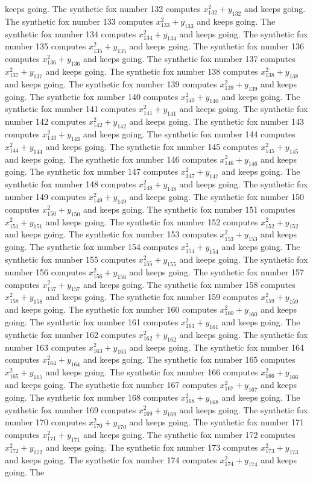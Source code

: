 \documentclass{article}
\begin{document}
keeps going. The synthetic fox number 132 computes $x_{132}^2 + y_{132}$ and keeps going. The synthetic fox number 133 computes $x_{133}^2 + y_{133}$ and keeps going. The synthetic fox number 134 computes $x_{134}^2 + y_{134}$ and keeps going. The synthetic fox number 135 computes $x_{135}^2 + y_{135}$ and keeps going. The synthetic fox number 136 computes $x_{136}^2 + y_{136}$ and keeps going. The synthetic fox number 137 computes $x_{137}^2 + y_{137}$ and keeps going. The synthetic fox number 138 computes $x_{138}^2 + y_{138}$ and keeps going. The synthetic fox number 139 computes $x_{139}^2 + y_{139}$ and keeps going. The synthetic fox number 140 computes $x_{140}^2 + y_{140}$ and keeps going. The synthetic fox number 141 computes $x_{141}^2 + y_{141}$ and keeps going. The synthetic fox number 142 computes $x_{142}^2 + y_{142}$ and keeps going. The synthetic fox number 143 computes $x_{143}^2 + y_{143}$ and keeps going. The synthetic fox number 144 computes $x_{144}^2 + y_{144}$ and keeps going. The synthetic fox number 145 computes $x_{145}^2 + y_{145}$ and keeps going. The synthetic fox number 146 computes $x_{146}^2 + y_{146}$ and keeps going. The synthetic fox number 147 computes $x_{147}^2 + y_{147}$ and keeps going. The synthetic fox number 148 computes $x_{148}^2 + y_{148}$ and keeps going. The synthetic fox number 149 computes $x_{149}^2 + y_{149}$ and keeps going. The synthetic fox number 150 computes $x_{150}^2 + y_{150}$ and keeps going. The synthetic fox number 151 computes $x_{151}^2 + y_{151}$ and keeps going. The synthetic fox number 152 computes $x_{152}^2 + y_{152}$ and keeps going. The synthetic fox number 153 computes $x_{153}^2 + y_{153}$ and keeps going. The synthetic fox number 154 computes $x_{154}^2 + y_{154}$ and keeps going. The synthetic fox number 155 computes $x_{155}^2 + y_{155}$ and keeps going. The synthetic fox number 156 computes $x_{156}^2 + y_{156}$ and keeps going. The synthetic fox number 157 computes $x_{157}^2 + y_{157}$ and keeps going. The synthetic fox number 158 computes $x_{158}^2 + y_{158}$ and keeps going. The synthetic fox number 159 computes $x_{159}^2 + y_{159}$ and keeps going. The synthetic fox number 160 computes $x_{160}^2 + y_{160}$ and keeps going. The synthetic fox number 161 computes $x_{161}^2 + y_{161}$ and keeps going. The synthetic fox number 162 computes $x_{162}^2 + y_{162}$ and keeps going. The synthetic fox number 163 computes $x_{163}^2 + y_{163}$ and keeps going. The synthetic fox number 164 computes $x_{164}^2 + y_{164}$ and keeps going. The synthetic fox number 165 computes $x_{165}^2 + y_{165}$ and keeps going. The synthetic fox number 166 computes $x_{166}^2 + y_{166}$ and keeps going. The synthetic fox number 167 computes $x_{167}^2 + y_{167}$ and keeps going. The synthetic fox number 168 computes $x_{168}^2 + y_{168}$ and keeps going. The synthetic fox number 169 computes $x_{169}^2 + y_{169}$ and keeps going. The synthetic fox number 170 computes $x_{170}^2 + y_{170}$ and keeps going. The synthetic fox number 171 computes $x_{171}^2 + y_{171}$ and keeps going. The synthetic fox number 172 computes $x_{172}^2 + y_{172}$ and keeps going. The synthetic fox number 173 computes $x_{173}^2 + y_{173}$ and keeps going. The synthetic fox number 174 computes $x_{174}^2 + y_{174}$ and keeps going. The 
\end{document}
